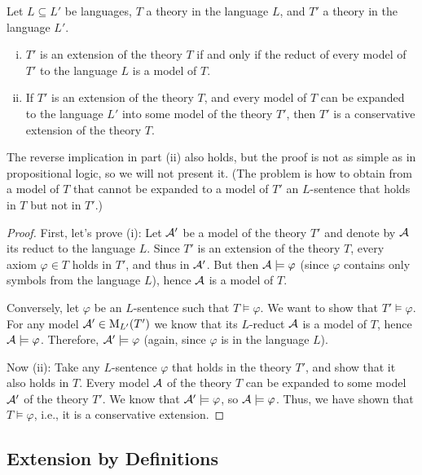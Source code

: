 \begin{proposition}\label{proposition:semantic-conditions-for-extensions}
    Let $L\subseteq L'$ be languages, $T$ a theory in the language $L$, and $T'$ a theory in the language $L'$.
    \begin{enumerate}[(i)]
        \item $T'$ is an extension of the theory $T$ if and only if the reduct of every model of $T'$ to the language $L$ is a model of $T$.
        \item If $T'$ is an extension of the theory $T$, and every model of $T$ can be expanded to the language $L'$ into some model of the theory $T'$, then $T'$ is a conservative extension of the theory $T$.
    \end{enumerate}
\end{proposition}
\begin{remark}
    The reverse implication in part (ii) also holds, but the proof is not as simple as in propositional logic, so we will not present it. (The problem is how to obtain from a model of $T$ that cannot be expanded to a model of $T'$ an $L$-sentence that holds in $T$ but not in $T'$.)
\end{remark}
\begin{proof}
    First, let's prove (i): Let $\mathcal{A}'$ be a model of the theory $T'$ and denote by $\mathcal{A}$ its reduct to the language $L$. Since $T'$ is an extension of the theory $T$, every axiom $\varphi\in T$ holds in $T'$, and thus in $\mathcal{A}'$. But then $\mathcal{A}\models\varphi$ (since $\varphi$ contains only symbols from the language $L$), hence $\mathcal{A}$ is a model of $T$.

    Conversely, let $\varphi$ be an $L$-sentence such that $T\models\varphi$. We want to show that $T'\models\varphi$. For any model $\mathcal{A}'\in\operatorname{M}_{L'}(T')$ we know that its $L$-reduct $\mathcal{A}$ is a model of $T$, hence $\mathcal{A}\models\varphi$. Therefore, $\mathcal{A}'\models\varphi$ (again, since $\varphi$ is in the language $L$).

    Now (ii): Take any $L$-sentence $\varphi$ that holds in the theory $T'$, and show that it also holds in $T$. Every model $\mathcal{A}$ of the theory $T$ can be expanded to some model $\mathcal{A}'$ of the theory $T'$. We know that $\mathcal{A}'\models\varphi$, so $\mathcal{A}\models\varphi$. Thus, we have shown that $T\models\varphi$, i.e., it is a conservative extension.
\end{proof}


\subsection{Extension by Definitions}\label{subsection:extension-by-definition}

